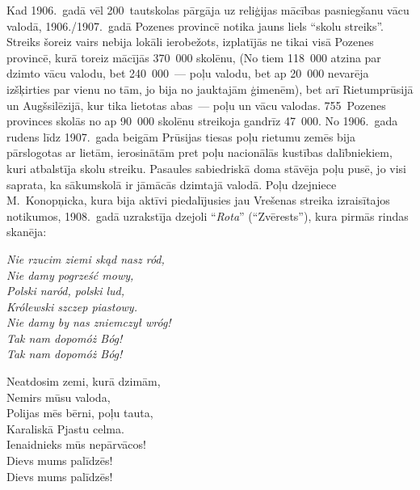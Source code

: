 \documentclass[twoside,a5paper,12pt,fleqn,openany]{extbook}
\newcommand{\pltxti}[1]{\textit{\textpolish{#1}}}
\begin{document}
Kad 1906.~gadā vēl 200~tautskolas pārgāja uz reliģijas mācības pasniegšanu vācu valodā, 1906./1907.~gadā Pozenes provincē notika jauns liels ``skolu streiks''. Streiks šoreiz vairs nebija lokāli ierobežots, izplatījās ne tikai visā Pozenes provincē, kurā toreiz mācījās 370~000 skolēnu, (No tiem 118~000 atzina par dzimto vācu valodu, bet 240~000~--- poļu valodu, bet ap 20~000 nevarēja izšķirties par vienu no tām, jo bija no jauktajām ģimenēm), bet arī Rietumprūsijā un Augšsilēzijā, kur tika lietotas abas~--- poļu un vācu valodas. 755~Pozenes provinces skolās no ap 90~000 skolēnu streikoja gandrīz 47~000. No 1906.~gada rudens līdz 1907.~gada beigām Prūsijas tiesas poļu rietumu zemēs bija pārslogotas ar lietām, ierosinātām pret poļu nacionālās kustības dalībniekiem, kuri atbalstīja skolu streiku. Pasaules sabiedriskā doma stāvēja poļu pusē, jo visi saprata, ka sākumskolā ir jāmācās dzimtajā valodā. Poļu dzejniece M.~Konopņicka, kura bija aktīvi piedalījusies jau Vrešenas streika izraisītajos notikumos, 1908.~gadā uzrakstīja dzejoli ``\pltxti{Rota}'' (``Zvērests''), kura pirmās rindas skanēja:

\vspace{1.5em}

\noindent
\begin{minipage}{0.5\textwidth}
\pltxti{Nie rzucim ziemi skąd nasz ród,\\
Nie damy pogrześć mowy,\\
Polski naród, polski lud,\\
Królewski szczep piastowy.\\
Nie damy by nas zniemczył wróg!\\
Tak nam dopomóż Bóg!\\
Tak nam dopomóż Bóg!}
\end{minipage}
\hspace{1em}
\begin{minipage}{0.5\textwidth}
Neatdosim zemi, kurā dzimām,\\
Nemirs mūsu valoda,\\
Polijas mēs bērni, poļu tauta,\\
Karaliskā Pjastu celma.\\
Ienaidnieks mūs nepārvācos!\\
Dievs mums palīdzēs!\\
Dievs mums palīdzēs!
\end{minipage}

\vspace{1.5em}

\end{document}
